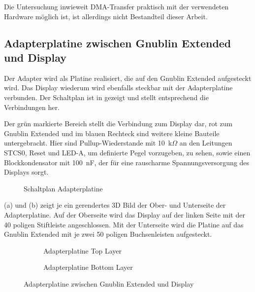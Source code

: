 Die Untersuchung inwieweit DMA-Transfer praktisch mit der verwendeten Hardware möglich ist, ist allerdings nicht Bestandteil dieser Arbeit. 

\newpage
\subsection{Adapterplatine zwischen Gnublin Extended und Display}
Der Adapter wird als Platine realisiert, die auf den Gnublin Extended aufgesteckt wird. Das Display wiederum wird ebenfalls steckbar mit der Adapterplatine verbunden. Der Schaltplan ist in  gezeigt und stellt entsprechend  die Verbindungen her.

Der grün markierte Bereich stellt die Verbindung zum Display dar, rot zum Gnublin Extended und im blauen Rechteck sind weitere kleine Bauteile untergebracht. Hier sind Pullup-Wiederstande mit 10~k$\Omega$ an den Leitungen STCS0, Reset und LED-A, um definierte Pegel vorzugeben, zu sehen, sowie einen Blockkondensator mit 100~nF, der für eine rauscharme Spannungsversorgung des Displays sorgt.

\begin{figure}[tbph]
	\centering
{}
	\caption{Schaltplan Adapterplatine}
	\label{fig:adapterplatine_sch}
\end{figure}
\newpage

 (a) und (b) zeigt je ein gerendertes 3D Bild der Ober- und Unterseite der Adapterplatine. Auf der Oberseite wird das Display auf der linken Seite mit der 40 poligen Stiftleiste angeschlossen. Mit der Unterseite wird die Platine auf das Gnublin Extended mit je zwei 50 poligen Buchsenleisten aufgesteckt.

\begin{figure}
        \begin{center}
        \begin{subfigure}[htp]{0.8\textwidth}
                \caption{Adapterplatine Top Layer}
                \label{fig:adapter_top}
        \end{subfigure}

        \begin{subfigure}[htp]{0.8\textwidth}
                             				\caption{Adapterplatine Bottom Layer}
                \label{fig:adapter_bot}
        \end{subfigure}
		\end{center}
        \caption{Adapterplatine zwischen Gnublin Extended und Display}\label{fig:adapterplatine}
\end{figure}

